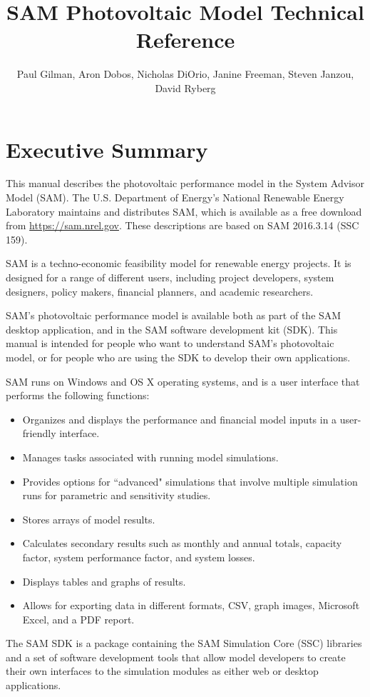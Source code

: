 \documentclass[12pt,letterpaper]{article}
\title{SAM Photovoltaic Model Technical Reference}
\author{Paul Gilman, Aron Dobos, Nicholas DiOrio, Janine Freeman, Steven Janzou, David Ryberg}
\begin{document}
\frontmatter
\chapter*{Executive Summary}

This manual describes the photovoltaic performance model in the System Advisor Model (SAM). The U.S. Department of Energy's National Renewable Energy Laboratory maintains and distributes SAM, which is available as a free download from \url{https://sam.nrel.gov}. These descriptions are based on SAM 2016.3.14 (SSC 159).

SAM is a techno-economic feasibility model for renewable energy projects. It is designed for a range of different users, including project developers, system designers, policy makers, financial planners, and academic researchers.

SAM's photovoltaic performance model is available both as part of the SAM desktop application, and in the SAM software development kit (SDK). This manual is intended for people who want to understand SAM's photovoltaic model, or for people who are using the SDK to develop their own applications.

SAM runs on Windows and OS X operating systems, and is a user interface that performs the following functions:

\begin{itemize}
\item Organizes and displays the performance and financial model inputs in a user-friendly interface.
\item Manages tasks associated with running model simulations.
\item Provides options for ``advanced" simulations that involve multiple simulation runs for parametric and sensitivity studies.
\item Stores arrays of model results.
\item Calculates secondary results such as monthly and annual totals, capacity factor, system performance factor, and system losses.
\item Displays tables and graphs of results.
\item Allows for exporting data in different formats, CSV, graph images, Microsoft Excel, and a PDF report.
\end{itemize}

The SAM SDK is a package containing the SAM Simulation Core (SSC) libraries and a set of software development tools that allow model developers to create their own interfaces to the simulation modules as either web or desktop applications.
\end{document}
